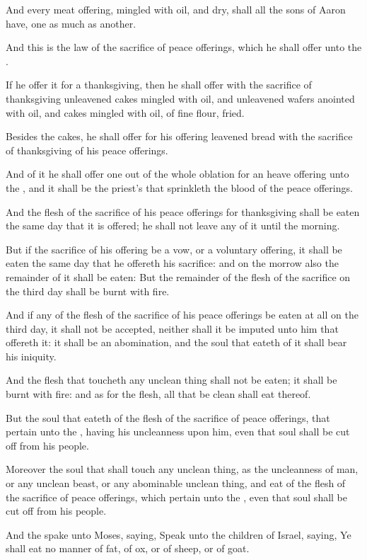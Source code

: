 \verse And every meat offering, mingled with oil, and dry, shall all the sons of Aaron have, one as much as another.

\verse And this is the law of the sacrifice of peace offerings, which he shall offer unto the \LORD.

\verse If he offer it for a thanksgiving, then he shall offer with the sacrifice of thanksgiving unleavened cakes mingled with oil, and unleavened wafers anointed with oil, and cakes mingled with oil, of fine flour, fried.

\verse Besides the cakes, he shall offer for his offering leavened bread with the sacrifice of thanksgiving of his peace offerings.

\verse And of it he shall offer one out of the whole oblation for an heave offering unto the \LORD, and it shall be the priest's that sprinkleth the blood of the peace offerings.

\verse And the flesh of the sacrifice of his peace offerings for thanksgiving shall be eaten the same day that it is offered; he shall not leave any of it until the morning.

\verse But if the sacrifice of his offering be a vow, or a voluntary offering, it shall be eaten the same day that he offereth his sacrifice: and on the morrow also the remainder of it shall be eaten: \verse But the remainder of the flesh of the sacrifice on the third day shall be burnt with fire.

\verse And if any of the flesh of the sacrifice of his peace offerings be eaten at all on the third day, it shall not be accepted, neither shall it be imputed unto him that offereth it: it shall be an abomination, and the soul that eateth of it shall bear his iniquity.

\verse And the flesh that toucheth any unclean thing shall not be eaten; it shall be burnt with fire: and as for the flesh, all that be clean shall eat thereof.

\verse But the soul that eateth of the flesh of the sacrifice of peace offerings, that pertain unto the \LORD, having his uncleanness upon him, even that soul shall be cut off from his people.

\verse Moreover the soul that shall touch any unclean thing, as the uncleanness of man, or any unclean beast, or any abominable unclean thing, and eat of the flesh of the sacrifice of peace offerings, which pertain unto the \LORD, even that soul shall be cut off from his people.

\verse And the \LORD spake unto Moses, saying, \verse Speak unto the children of Israel, saying, Ye shall eat no manner of fat, of ox, or of sheep, or of goat.


